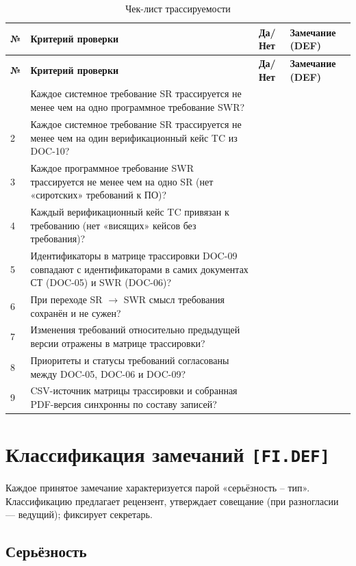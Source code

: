 \documentclass[12pt,a4paper]{article}
\begin{document}
\begin{longtable}{|p{0.8cm}|p{6.3cm}|p{1.8cm}|p{5.2cm}|}
\caption{Чек-лист трассируемости}\\
\hline
\textbf{№} & \textbf{Критерий проверки} & \textbf{Да/Нет} & \textbf{Замечание (DEF)} \\
\hline
\endfirsthead
\hline
\textbf{№} & \textbf{Критерий проверки} & \textbf{Да/Нет} & \textbf{Замечание (DEF)} \\
\hline
\endhead
\hline
\endfoot
\hline
\endlastfoot
1 & Каждое системное требование SR трассируется не менее чем на одно программное требование SWR? & & \\
\hline
2 & Каждое системное требование SR трассируется не менее чем на один верификационный кейс TC из DOC-10? & & \\
\hline
3 & Каждое программное требование SWR трассируется не менее чем на одно SR (нет «сиротских» требований к ПО)? & & \\
\hline
4 & Каждый верификационный кейс TC привязан к требованию (нет «висящих» кейсов без требования)? & & \\
\hline
5 & Идентификаторы в матрице трассировки DOC-09 совпадают с идентификаторами в самих документах СТ (DOC-05) и SWR (DOC-06)? & & \\
\hline
6 & При переходе SR $\to$ SWR смысл требования сохранён и не сужен? & & \\
\hline
7 & Изменения требований относительно предыдущей версии отражены в матрице трассировки? & & \\
\hline
8 & Приоритеты и статусы требований согласованы между DOC-05, DOC-06 и DOC-09? & & \\
\hline
9 & CSV-источник матрицы трассировки и собранная PDF-версия синхронны по составу записей? & & \\
\hline
\end{longtable}

\section{Классификация замечаний \texttt{[FI.DEF]}}
\label{sec:def}

Каждое принятое замечание характеризуется парой «серьёзность -- тип».
Классификацию предлагает рецензент, утверждает совещание (при разногласии ---
ведущий); фиксирует секретарь.

\subsection{Серьёзность}
\label{subsec:severity}
\end{document}
